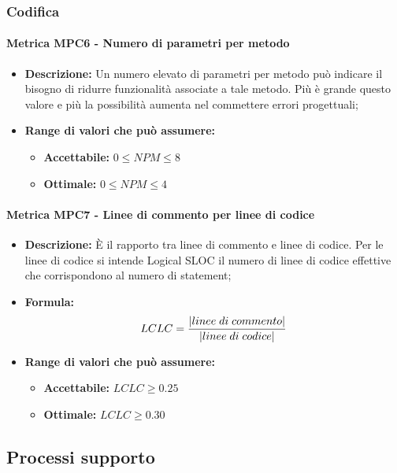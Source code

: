 \subsubsection{Codifica}  
    \paragraph{Metrica MPC6 - Numero di parametri per metodo} 
    \begin{itemize}
        \item \textbf{Descrizione:} Un numero elevato di parametri per metodo può indicare il bisogno di ridurre funzionalità associate a tale metodo. Più è grande questo valore e più la possibilità aumenta nel commettere errori progettuali;
        \item \textbf{Range di valori che può assumere:}
        \begin{itemize}
            \item \textbf{Accettabile:} $0 \leq{} NPM \leq 8$
            \item \textbf{Ottimale:} $0 \leq{} NPM \leq 4$
        \end{itemize}
    \end{itemize}

    \paragraph{Metrica MPC7 - Linee di commento per linee di codice}
    \begin{itemize}
        \item \textbf{Descrizione:} È il rapporto tra linee di commento e linee di codice. Per le linee di codice si intende Logical SLOC il numero di linee di codice effettive che corrispondono al numero di statement;
        \item \textbf{Formula:}$$LCLC = {|linee \; di \; commento| \over |linee \; di \; codice|}$$
        \item \textbf{Range di valori che può assumere:}
        \begin{itemize}
            \item \textbf{Accettabile:} $LCLC \geq 0.25$
            \item \textbf{Ottimale:} $LCLC \geq 0.30$
        \end{itemize}
    \end{itemize}

\subsection{Processi supporto}

